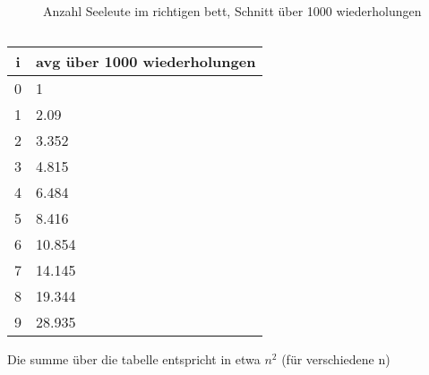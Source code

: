 \documentclass{article}
\begin{document}
	\maketitle
	\section{}
	\subsection{}
	\begin{figure}[h!]
  		\caption{Anzahl Seeleute im richtigen bett, Schnitt über 1000 wiederholungen}
    \end{figure}
    \subsection{}
    \begin{tabular}{c|l}
        \textbf{i}&\textbf{avg über 1000 wiederholungen}\\
        \hline
        0&1\\
        1&2.09\\
        2&3.352\\
        3&4.815\\
        4&6.484\\
        5&8.416\\
        6&10.854\\
        7&14.145\\
        8&19.344\\
        9&28.935
    \end{tabular}
    Die summe über die tabelle entspricht in etwa $n^2$ (für verschiedene n)
    \subsection{}
\end{document}
